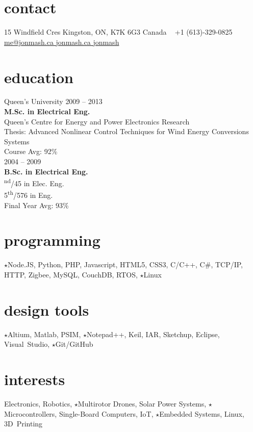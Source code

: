 
\begin{aside}
%
\section{contact}
15 Windfield Cres
Kingston, ON, K7K 6G3
Canada
~
+1 (613)-329-0825
~
\href{mailto:me@jonmash.ca}{me@jonmash.ca \faEnvelope}
\href{http://www.jonmash.ca}{jonmash.ca \faLink}
\href{https://github.com/jonmash}{jonmash \faGithub}
%
\section{education}
\restorecr
{\headingfont Queen's University}
{2009 -- 2013} \\
\textbf{M.Sc. {\normalfont in Electrical Eng.}}\\
{\bodyfontit Queen’s Centre for Energy and Power Electronics Research}\\
Thesis: Advanced Nonlinear Control Techniques for Wind Energy Conversions Systems\\
Course Avg: 92\%\\
\vspace{0.3cm}
{2004 -- 2009} \\
\textbf{B.Sc. {\normalfont in Electrical Eng.}}\\
{\textsuperscript{nd}/45 in Elec. Eng. \\ 5\textsuperscript{th}/576 in Eng.}\\
Final Year Avg: 93\%\\
%
\section{programming}
{\color{orange} $\star$}Node.JS, Python, PHP,
Javascript, HTML5, CSS3, C/C++, C\#,  
TCP/IP, HTTP, Zigbee, 
MySQL, CouchDB, 
RTOS, {\color{orange} $\star$}Linux
%
\section{design tools}
{\color{orange} $\star$}Altium, Matlab, PSIM, {\color{orange} $\star$}Notepad++, Keil, IAR, Sketchup, Eclipse, Visual~Studio, {\color{orange} $\star$}Git/GitHub
%
\section{interests}
Electronics, Robotics, {\color{orange} $\star$}Multirotor Drones, Solar Power Systems, {\color{orange} $\star$}Microcontrollers, Single-Board Computers, IoT, {\color{orange} $\star$}Embedded Systems, Linux, 3D~Printing
\obeycr
\end{aside}